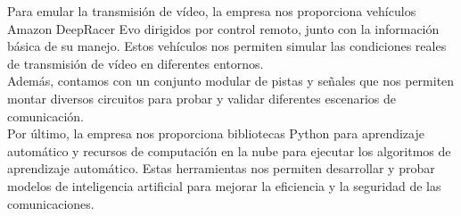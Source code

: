 Para emular la transmisión de vídeo, la empresa nos proporciona vehículos Amazon DeepRacer Evo dirigidos por control remoto, junto con la información básica de su manejo. Estos vehículos nos permiten simular las condiciones reales de transmisión de vídeo en diferentes entornos.\\

Además, contamos con un conjunto modular de pistas y señales que nos permiten montar diversos circuitos para probar y validar diferentes escenarios de comunicación.\\

Por último, la empresa nos proporciona bibliotecas Python para aprendizaje automático y recursos de computación en la nube para ejecutar los algoritmos de aprendizaje automático. Estas herramientas nos permiten desarrollar y probar modelos de inteligencia artificial para mejorar la eficiencia y la seguridad de las comunicaciones.